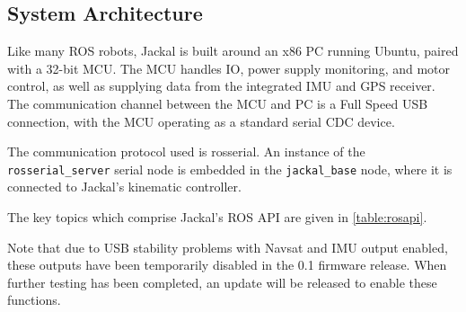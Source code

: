 \documentclass[]{clearpath-latex/clearpath-manual}
\begin{document}
\subsection{System Architecture}

Like many ROS robots, Jackal is built around an x86 PC running Ubuntu, paired with a
32-bit MCU. The MCU handles IO, power supply monitoring, and motor control, as well as
supplying data from the integrated IMU and GPS receiver. The communication channel
between the MCU and PC is a Full Speed USB connection, with the MCU operating as a
standard serial CDC device.

The communication protocol used is rosserial. An instance of the \lstinline{rosserial_server}
serial node is embedded in the \lstinline{jackal_base} node, where it is connected to
Jackal's kinematic controller.

The key topics which comprise Jackal's ROS API are given in \autoref{table:rosapi}.


\begin{warning}
Note that due to USB stability problems with Navsat and IMU output enabled, these outputs
have been temporarily disabled in the 0.1 firmware release. When further testing has been
completed, an update will be released to enable these functions.
\end{warning}
\end{document}

